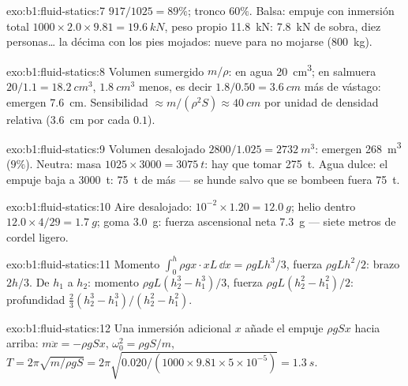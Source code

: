\begin{solution}{exo:b1:fluid-statics:7}
$917/1025 = 89\%$; tronco $60\%$. Balsa: empuje con inmersión total $1000 \times
2.0 \times 9.81 = \qty{19.6}{kN}$, peso propio \qty{11.8}{kN}: \qty{7.8}{kN}
de sobra, diez personas\dots{} la décima con los pies mojados: nueve para no
mojarse (\qty{800}{kg}).
\end{solution}

\begin{solution}{exo:b1:fluid-statics:8}
Volumen sumergido $m/\rho$: en agua \qty{20}{cm^3}; en salmuera $20/1.1 = \qty{18.2}{cm^3}$,
$\qty{1.8}{cm^3}$ menos, es decir $1.8/0.50 = \qty{3.6}{cm}$ más de vástago: emergen
\qty{7.6}{cm}. Sensibilidad $\approx m/(\rho^2S) \approx \qty{40}{cm}$ por unidad de
densidad relativa (\qty{3.6}{cm} por cada $0.1$).
\end{solution}

\begin{solution}{exo:b1:fluid-statics:9}
Volumen desalojado $2800/1.025 = \qty{2732}{m^3}$: emergen \qty{268}{m^3}
($9\%$). Neutra: masa $1025 \times 3000 = \qty{3075}{t}$: hay que tomar \qty{275}{t}.
Agua dulce: el empuje baja a \qty{3000}{t}: \qty{75}{t} de más --- se hunde
salvo que se bombeen fuera \qty{75}{t}.
\end{solution}

\begin{solution}{exo:b1:fluid-statics:10}
Aire desalojado: $10^{-2} \times 1.20 = \qty{12.0}{g}$; helio dentro $12.0 \times
4/29 = \qty{1.7}{g}$; goma \qty{3.0}{g}: fuerza ascensional neta \qty{7.3}{g} --- siete metros
de cordel ligero.
\end{solution}

\begin{solution}{exo:b1:fluid-statics:11}
Momento $\int_0^h\rho gx\cdot xL\,\dd x = \rho gLh^3/3$, fuerza $\rho gLh^2/2$:
brazo $2h/3$. De $h_1$ a $h_2$: momento $\rho gL(h_2^3 - h_1^3)/3$, fuerza
$\rho gL(h_2^2 - h_1^2)/2$: profundidad $\frac23(h_2^3 - h_1^3)/(h_2^2 - h_1^2)$.
\end{solution}

\begin{solution}{exo:b1:fluid-statics:12}
Una inmersión adicional $x$ añade el empuje $\rho gSx$ hacia arriba: $m\ddot x = -\rho gSx$,
$\omega_0^2 = \rho gS/m$, $T = 2\pi\sqrt{m/\rho gS} = 2\pi\sqrt{0.020/(1000 \times
9.81 \times 5\times10^{-5})} = \qty{1.3}{s}$.
\end{solution}


